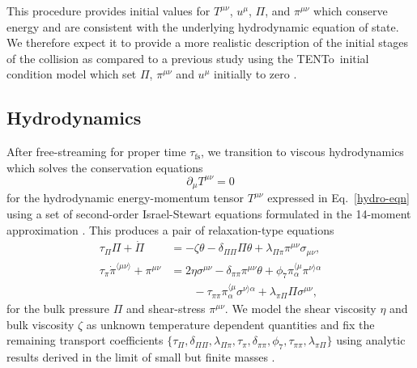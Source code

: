 \documentclass[aps,prc,reprint,amsmath,nofootinbib]{revtex4-1}
\newcommand{\trento}{T\raisebox{-0.5ex}{R}ENTo}
\newcommand{\taufs}{\tau_\text{fs}}
\begin{document}
This procedure provides initial values for $T^{\mu\nu}$, $u^\mu$, $\Pi$, and $\pi^{\mu\nu}$ which conserve energy and are consistent with the underlying hydrodynamic equation of state.
We therefore expect it to provide a more realistic description of the initial stages of the collision as compared to a previous study using the \trento\ initial condition model which set $\Pi$, $\pi^{\mu\nu}$ and $u^\mu$ initially to zero \cite{Bernhard:2016tnd}.

\subsection{Hydrodynamics}

After free-streaming for proper time $\taufs$, we transition to viscous hydrodynamics which solves the conservation equations
\begin{equation}
  \label{eq:continuity}
  \partial_\mu T^{\mu\nu} = 0
\end{equation}
for the hydrodynamic energy-momentum tensor $T^{\mu\nu}$ expressed in Eq.~\eqref{hydro-eqn} using a set of second-order Israel-Stewart equations formulated in the 14-moment approximation
\cite{Israel:1979wp, Israel:1976aa, Denicol:2012cn, Denicol:2010xn}.
This produces a pair of relaxation-type equations
\begin{subequations}
  \label{eq:relaxation}
  \begin{align}
    \tau_\Pi \Pi + \dot{\Pi} &=
      - \zeta \theta - \delta_{\Pi\Pi} \Pi\theta
      + \lambda_{\Pi\pi} \pi^{\mu\nu} \sigma_{\mu\nu}, \\[1ex]
    \tau_\pi \dot{\pi}^{\langle \mu\nu \rangle} + \pi^{\mu\nu} &=
      2\eta\sigma^{\mu\nu} - \delta_{\pi\pi} \pi^{\mu\nu} \theta
      + \phi_7 \pi_\alpha^{\langle \mu} \pi^{\nu \rangle \alpha} \nonumber \\
      &\qquad {} - \tau_{\pi\pi} \pi_\alpha^{\langle \mu}\sigma^{\nu \rangle \alpha}
      + \lambda_{\pi\Pi} \Pi \sigma^{\mu\nu},
  \end{align}
\end{subequations}
for the bulk pressure $\Pi$ and shear-stress $\pi^{\mu\nu}$.
We model the shear viscosity $\eta$ and bulk viscosity $\zeta$ as unknown temperature dependent quantities and fix the remaining transport coefficients $\{\tau_\Pi, \delta_{\Pi\Pi}, \lambda_{\Pi\pi}, \tau_\pi, \delta_{\pi\pi}, \phi_7, \tau_{\pi\pi}, \lambda_{\pi\Pi}\}$ using analytic results derived in the limit of small but finite masses \cite{Denicol:2014vaa}.
\end{document}
